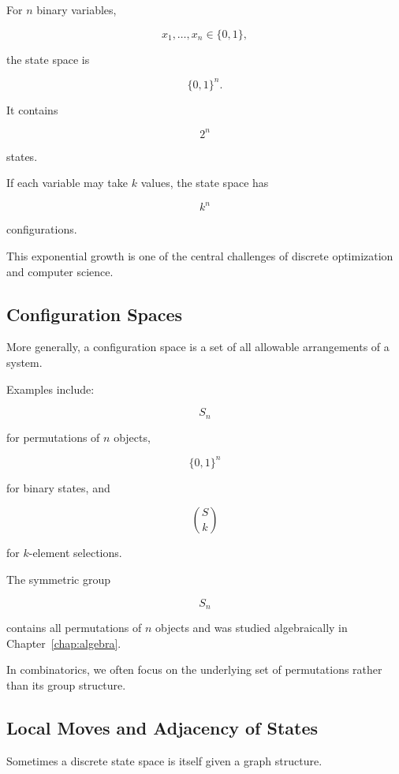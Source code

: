 For \(n\) binary variables,

\[
x_1,\ldots,x_n\in\{0,1\},
\]

the state space is

\[
\boxed{
\{0,1\}^{n}.
}
\]

It contains

\[
\boxed{
2^n
}
\]

states.

If each variable may take \(k\) values, the state space has

\[
\boxed{
k^n
}
\]

configurations.

This exponential growth is one of the central challenges of discrete
optimization and computer science.

\subsection{Configuration Spaces}
\label{subsec:configuration-spaces-discrete}

More generally, a configuration space is a set of all allowable
arrangements of a system.

Examples include:

\[
S_n
\]

for permutations of \(n\) objects,

\[
\{0,1\}^{n}
\]

for binary states, and

\[
\binom{S}{k}
\]

for \(k\)-element selections.

The symmetric group

\[
S_n
\]

contains all permutations of \(n\) objects and was studied algebraically
in Chapter~\ref{chap:algebra}.

In combinatorics, we often focus on the underlying set of permutations
rather than its group structure.

\subsection{Local Moves and Adjacency of States}
\label{subsec:local-moves}

Sometimes a discrete state space is itself given a graph structure.

